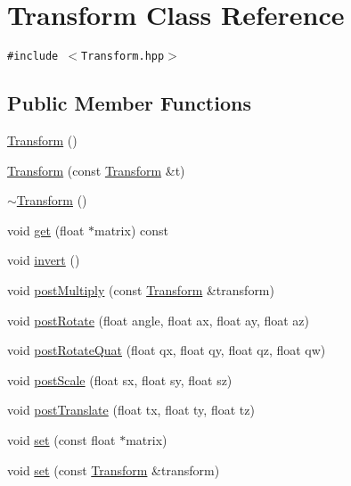 \hypertarget{classm3g_1_1Transform}{
\section{Transform Class Reference}
\label{classm3g_1_1Transform}
}
{\tt \#include $<$Transform.hpp$>$}

\subsection*{Public Member Functions}
\begin{CompactItemize}
\item 
\hyperlink{classm3g_1_1Transform_9de68ec1c9b7809129814a3233ae4655}{Transform} ()
\item 
\hyperlink{classm3g_1_1Transform_6f8c18ec2bd6b5c0d7f3472752ec79d1}{Transform} (const \hyperlink{classm3g_1_1Transform}{Transform} \&t)
\item 
\hyperlink{classm3g_1_1Transform_8e627263611a76aad02c9e0b89287c68}{$\sim$Transform} ()
\item 
void \hyperlink{classm3g_1_1Transform_f78faf7dcc06f53604ad08965babb7b3}{get} (float $\ast$matrix) const 
\item 
void \hyperlink{classm3g_1_1Transform_7fa1616cc61c19a5efcc863c950f7f30}{invert} ()
\item 
void \hyperlink{classm3g_1_1Transform_ad6083d90dbecc7e5bb39d5062723a0d}{postMultiply} (const \hyperlink{classm3g_1_1Transform}{Transform} \&transform)
\item 
void \hyperlink{classm3g_1_1Transform_4abf135257f132cdf9580f3a3e11ea6c}{postRotate} (float angle, float ax, float ay, float az)
\item 
void \hyperlink{classm3g_1_1Transform_7ce6ca00ac17bc4bb5f271c48da5e2dc}{postRotateQuat} (float qx, float qy, float qz, float qw)
\item 
void \hyperlink{classm3g_1_1Transform_4cbb4aa3878b658da54a144896f71446}{postScale} (float sx, float sy, float sz)
\item 
void \hyperlink{classm3g_1_1Transform_638498b811d6ccdf60b7f1f3de157ed6}{postTranslate} (float tx, float ty, float tz)
\item 
void \hyperlink{classm3g_1_1Transform_d1a2203142a848286c80d66c8c7fa37d}{set} (const float $\ast$matrix)
\item 
void \hyperlink{classm3g_1_1Transform_8926ff19517a76de8f938025e9d3163d}{set} (const \hyperlink{classm3g_1_1Transform}{Transform} \&transform)
\item 

\end{CompactItemize}
